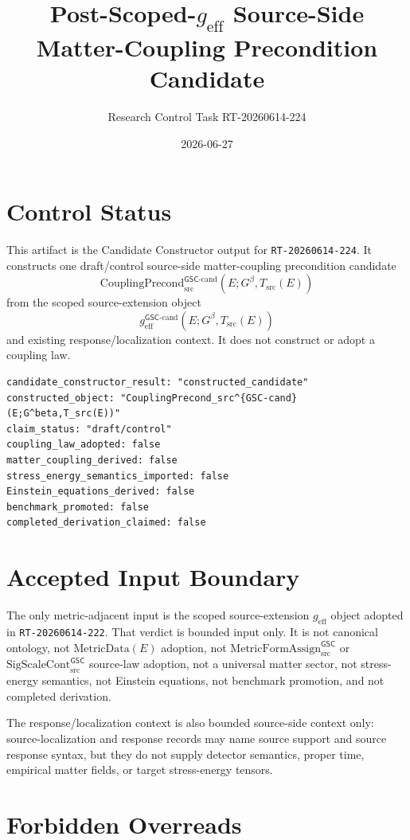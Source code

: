\documentclass[11pt]{article}
\title{Post-Scoped-\texorpdfstring{$g_{\mathrm{eff}}$}{g_eff} Source-Side Matter-Coupling Precondition Candidate}
\author{Research Control Task RT-20260614-224}
\date{2026-06-27}
\newcommand{\Gbeta}{G^\beta}
\newcommand{\geff}{g_{\mathrm{eff}}}
\newcommand{\geffCand}{g_{\mathrm{eff}}^{\mathsf{GSC}\mbox{-}\mathrm{cand}}}
\newcommand{\CouplingPrecond}{\mathrm{CouplingPrecond}^{\mathsf{GSC}\mbox{-}\mathrm{cand}}_{\mathrm{src}}}
\begin{document}
\maketitle

\section{Control Status}

This artifact is the Candidate Constructor output for
\texttt{RT-20260614-224}. It constructs one draft/control source-side
matter-coupling precondition candidate
\[
  \CouplingPrecond(E;\Gbeta,T_{\mathrm{src}}(E))
\]
from the scoped source-extension object
\[
  \geffCand(E;\Gbeta,T_{\mathrm{src}}(E))
\]
and existing response/localization context. It does not construct or adopt a
coupling law.

\begin{verbatim}
candidate_constructor_result: "constructed_candidate"
constructed_object: "CouplingPrecond_src^{GSC-cand}(E;G^beta,T_src(E))"
claim_status: "draft/control"
coupling_law_adopted: false
matter_coupling_derived: false
stress_energy_semantics_imported: false
Einstein_equations_derived: false
benchmark_promoted: false
completed_derivation_claimed: false
\end{verbatim}

\section{Accepted Input Boundary}

The only metric-adjacent input is the scoped source-extension \(\geff\) object
adopted in \texttt{RT-20260614-222}. That verdict is bounded input only. It is
not canonical ontology, not \(\mathrm{MetricData}(E)\) adoption, not
\(\mathrm{MetricFormAssign}_{\mathrm{src}}^{\mathsf{GSC}}\) or
\(\mathrm{SigScaleCont}_{\mathrm{src}}^{\mathsf{GSC}}\) source-law adoption,
not a universal matter sector, not stress-energy semantics, not Einstein
equations, not benchmark promotion, and not completed derivation.

The response/localization context is also bounded source-side context only:
source-localization and response records may name source support and source
response syntax, but they do not supply detector semantics, proper time,
empirical matter fields, or target stress-energy tensors.

\section{Forbidden Overreads}
\end{document}
